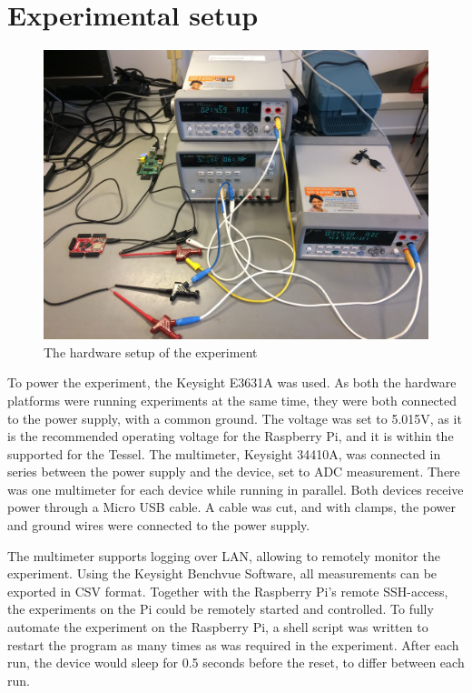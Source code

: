 \section{Experimental setup}
\label{sec:expsetup}
\begin{figure}[h!]
\centering
\includegraphics[width=\textwidth]{fig/pics/setup.jpg}
\caption{The hardware setup of the experiment}
\label{fig:setup}
\end{figure}
To power the experiment, the Keysight E3631A was used. 
As both the hardware platforms were running experiments at the same time, they were both connected to the power supply, with a common ground.
The voltage was set to 5.015\si{\volt}, as it is the recommended operating voltage for the Raspberry Pi, and it is within the supported for the Tessel. 
The multimeter, Keysight 34410A, was connected in series between the power supply and the device, set to ADC measurement. 
There was one multimeter for each device while running in parallel.
Both devices receive power through a Micro USB cable.
A cable was cut, and with clamps, the power and ground wires were connected to the power supply.

The multimeter supports logging over LAN, allowing to remotely monitor the experiment.
Using the Keysight Benchvue Software, all measurements can be exported in CSV format.
Together with the Raspberry Pi's remote SSH-access, the experiments on the Pi could be remotely started and controlled.
To fully automate the experiment on the Raspberry Pi, a shell script was written to restart the program as many times as was required in the experiment.
After each run, the device would sleep for 0.5 seconds before the reset, to differ between each run.

